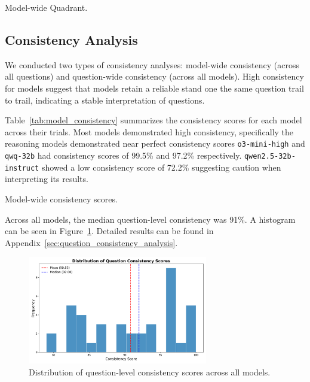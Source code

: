 \begin{table}[htbp]
    \centering
    \caption{Model-wide Quadrant.}
    \label{tab:model_quadrant}
\end{table}

\subsection{Consistency Analysis}

We conducted two types of consistency analyses: model-wide consistency (across all questions) and question-wide consistency (across all models). High consistency for models suggest that models retain a reliable stand one the same question trail to trail, indicating a stable interpretation of questions. 

Table~\ref{tab:model_consistency} summarizes the consistency scores for each model across their trials. Most models demonstrated high consistency, specifically the reasoning models demonstrated near perfect consistency scores \texttt{o3-mini-high} and \texttt{qwq-32b} had consistency scores of 99.5\% and 97.2\% respectively. \texttt{qwen2.5-32b-instruct} showed a low consistency score of 72.2\% suggesting caution when interpreting its results.

\begin{table}[htbp]
    \centering
    \caption{Model-wide consistency scores.}
    \label{tab:model_consistency}
\end{table}

Across all models, the median question-level consistency was 91\%. A histogram can be seen in Figure~\ref{fig:question_consistency_histogram}. Detailed results can be found in Appendix~\ref{sec:question_consistency_analysis}.

\begin{figure}[htbp]
    \centering
    \includegraphics[width=0.7\textwidth]{figures/histogram_question_consistency.png}
    \caption{Distribution of question-level consistency scores across all models.}
    \label{fig:question_consistency_histogram}
\end{figure}

